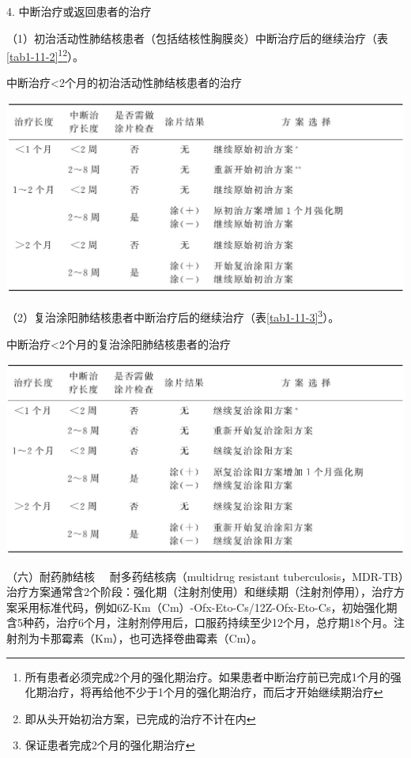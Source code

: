 4. 中断治疗或返回患者的治疗

（1）初治活动性肺结核患者（包括结核性胸膜炎）中断治疗后的继续治疗（表\ref{tab1-11-2}\footnote{所有患者必须完成2个月的强化期治疗。如果患者中断治疗前已完成1个月的强化期治疗，将再给他不少于1个月的强化期治疗，而后才开始继续期治疗}\footnote{即从头开始初治方案，已完成的治疗不计在内}）。

\begin{table}[htbp]
\centering
\caption{中断治疗\textless{}2个月的初治活动性肺结核患者的治疗}
\label{tab1-11-2}
\includegraphics{./images/Image00025.jpg}
\end{table}

（2）复治涂阳肺结核患者中断治疗后的继续治疗（表\ref{tab1-11-3}\footnote{保证患者完成2个月的强化期治疗}）。

\begin{table}[htbp]
\centering
\caption{中断治疗\textless{}2个月的复治涂阳肺结核患者的治疗}
\label{tab1-11-3}
\includegraphics{./images/Image00026.jpg}
\end{table}

{（六）耐药肺结核} 　耐多药结核病（multidrug resistant
tuberculosis，MDR-TB）治疗方案通常含2个阶段：强化期（注射剂使用）和继续期（注射剂停用），治疗方案采用标准代码，例如6Z-Km（Cm）-Ofx-Eto-Cs/12Z-Ofx-Eto-Cs，初始强化期含5种药，治疗6个月，注射剂停用后，口服药持续至少12个月，总疗期18个月。注射剂为卡那霉素（Km），也可选择卷曲霉素（Cm）。

